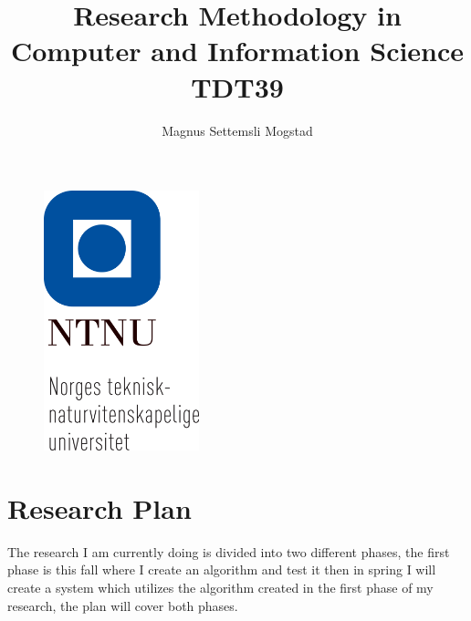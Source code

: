 \documentclass[12pt,runningheads]{article}
\begin{document}
\title{Research Methodology in Computer and Information Science \\ \small TDT39}
\author{Magnus Settemsli Mogstad}
\date{\vspace{-5ex}}
\maketitle
\begin{figure}[h!]
	\centering
    \includegraphics[width=0.4\textwidth]{ntnu_hele_navnet_staaende_bm.png}
\end{figure}

\pagebreak


\section*{Research Plan}
The research I am currently doing is divided into two different phases, the first phase is this fall where I create an algorithm and test it then in spring I will create a system which utilizes the algorithm created in the first phase of my research, the plan will cover both phases.
\end{document}
